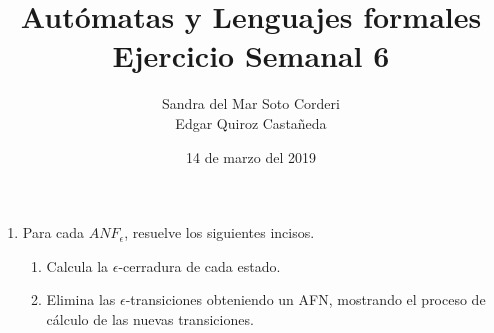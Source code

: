 \documentclass{article}
\begin{document}
    \title{
        Autómatas y Lenguajes formales \\
        Ejercicio Semanal 6
    }

    \author{
        Sandra del Mar Soto Corderi \\
        Edgar Quiroz Castañeda
    }

    \date{
        14 de marzo del 2019
    }
    
    \maketitle

    \begin{enumerate}
        \item {
            Para cada 	$ANF_{\epsilon}$, resuelve los siguientes incisos.
            \begin{enumerate}
                \item Calcula la $\epsilon$-cerradura de cada estado.
                
				\item Elimina las $\epsilon$-transiciones obteniendo un AFN, 
				mostrando el proceso de cálculo de las nuevas transiciones.
            \end{enumerate}
        }
       \end{enumerate}
\end{document}

